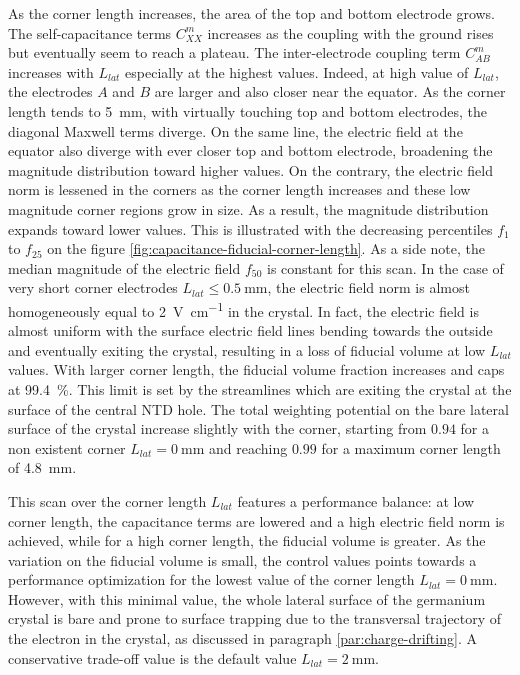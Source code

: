 As the corner length increases, the area of the top and bottom electrode grows. The self-capacitance terms $C_{XX}^m$ increases as the coupling with the ground rises but eventually seem to reach a plateau. The inter-electrode coupling term $C_{AB}^m$ increases with $L_{lat}$ especially at the highest values. Indeed, at high value of $L_{lat}$, the electrodes $A$ and $B$ are larger and also closer near the equator. As the corner length tends to \SI{5}{\mm}, with virtually touching top and bottom electrodes, the diagonal Maxwell terms diverge. On the same line, the electric field at the equator also diverge with ever closer top and bottom electrode, broadening the magnitude distribution toward higher values.
On the contrary, the electric field norm is lessened in the corners as the corner length increases and these low magnitude corner regions grow in size. As a result, the magnitude distribution expands toward lower values. This is illustrated with the decreasing percentiles $f_1$ to $f_{25}$ on the figure \ref{fig:capacitance-fiducial-corner-length}. As a side note, the median magnitude of the electric field $f_{50}$ is constant for this scan. In the case of very short corner electrodes $L_{lat} \leq \SI{0.5}{\mm}$, the electric field norm is almost homogeneously equal to \SI{2}{\volt\per\cm} in the crystal.
In fact, the electric field is almost uniform with the surface electric field lines bending towards the outside and eventually exiting the crystal, resulting in a loss of fiducial volume at low $L_{lat}$ values. With larger corner length, the fiducial volume fraction increases and caps at \SI{99.4}{\percent}. This limit is set by the streamlines which are exiting the crystal at the surface of the central NTD hole.
The total weighting potential on the bare lateral surface of the crystal increase slightly with the corner, starting from $0.94$ for a non existent corner $L_{lat}=\SI{0}{\mm}$ and reaching $0.99$ for a maximum corner length of \SI{4.8}{\mm}.   

This scan over the corner length $L_{lat}$ features a performance balance: at low corner length, the capacitance terms are lowered and a high electric field norm is achieved, while for a high corner length, the fiducial volume is greater. As the variation on the fiducial volume is small, the control values points towards a performance optimization for the lowest value of the corner length $L_{lat}=\SI{0}{\mm}$. However, with this minimal value, the whole lateral surface of the germanium crystal is bare and prone to surface trapping due to the transversal trajectory of the electron in the crystal, as discussed in paragraph \ref{par:charge-drifting}. A conservative trade-off value is the default value $L_{lat}=\SI{2}{\mm}$.

